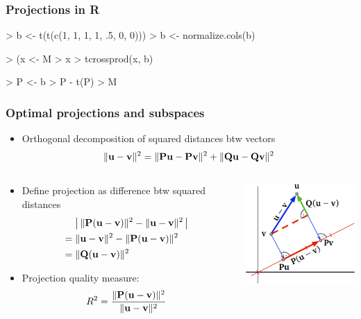 \documentclass[t]{beamer} %
\begin{document}
\begin{frame}[fragile]
  \frametitle{Projections in R}

  \begin{Rcode}
> b <- t(t(c(1, 1, 1, 1, .5, 0, 0)))
> b <- normalize.cols(b) 

> (x <- M %
> x %
> tcrossprod(x, b) 

> P <- b %
> P - t(P)         
> M %
\end{Rcode}

\end{frame}

\begin{frame}
  \frametitle{Optimal projections and subspaces}

  \begin{itemize}
  \item Orthogonal decomposition of squared distances btw vectors
    \[
      \norm{\vu - \vv}^2 = \norm{\mathbf{P} \vu - \mathbf{P} \vv}^2 + \norm{\mathbf{Q} \vu - \mathbf{Q} \vv}^2
    \]
  \end{itemize}

  \begin{columns}[c]
    \begin{column}{60mm}
      \begin{itemize}
      \item<2-> Define projection  as difference btw squared distances
        \begin{align*}
          & \bigabs{\,\norm{\mathbf{P}(\vu - \vv)}^2 - \norm{\vu - \vv}^2\,} \\
          =\;& \norm{\vu - \vv}^2 - \norm{\mathbf{P}(\vu - \vv)}^2 \\
          =\;& \norm{\mathbf{Q}(\vu - \vv)}^2
        \end{align*}
      \item<3-> Projection quality measure:
        \[
          R^2 = \frac{\norm{\mathbf{P}(\vu - \vv)}^2}{\norm{\vu - \vv}^2}
        \]
      \end{itemize}
    \end{column}
    \begin{column}{40mm}
      \hspace*{-5mm}%
      \includegraphics[width=45mm]{img/3_projection_loss}      
    \end{column}
  \end{columns}
\end{frame}
\end{document}
